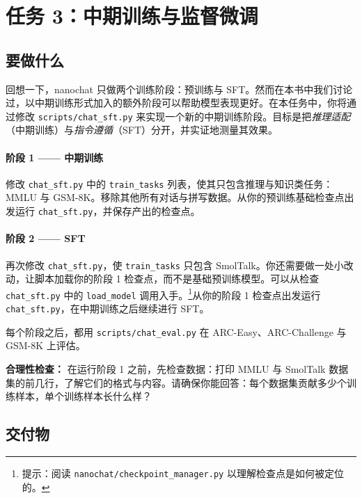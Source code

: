 

\section{任务 3：中期训练与监督微调}
\label{sec:task3}

\subsection{要做什么}

回想一下，nanochat 只做两个训练阶段：预训练与 SFT。然而在本书中我们讨论过，以中期训练形式加入的额外阶段可以帮助模型表现更好。在本任务中，你将通过修改 \texttt{scripts/chat\_sft.py} 来实现一个新的中期训练阶段。目标是把\emph{推理适配}（中期训练）与\emph{指令遵循}（SFT）分开，并实证地测量其效果。

\paragraph{阶段 1 —— 中期训练}
修改 \texttt{chat\_sft.py} 中的 \texttt{train\_tasks} 列表，使其只包含推理与知识类任务：MMLU 与 GSM-8K。移除其他所有对话与拼写数据。从你的预训练基础检查点出发运行 \texttt{chat\_sft.py}，并保存产出的检查点。

\paragraph{阶段 2 —— SFT}
再次修改 \texttt{chat\_sft.py}，使 \texttt{train\_tasks} 只包含 SmolTalk。你还需要做一处小改动，让脚本加载你的阶段 1 检查点，而不是基础预训练模型。可以从检查 \texttt{chat\_sft.py} 中的 \texttt{load\_model} 调用入手。\footnote{提示：阅读 \texttt{nanochat/checkpoint\_manager.py} 以理解检查点是如何被定位的。}从你的阶段 1 检查点出发运行 \texttt{chat\_sft.py}，在中期训练之后继续进行 SFT。

每个阶段之后，都用 \texttt{scripts/chat\_eval.py} 在 ARC-Easy、ARC-Challenge 与 GSM-8K 上评估。

\textbf{合理性检查：} 在运行阶段 1 之前，先检查数据：打印 MMLU 与 SmolTalk 数据集的前几行，了解它们的格式与内容。请确保你能回答：每个数据集贡献多少个训练样本，单个训练样本长什么样？

\subsection{交付物}

